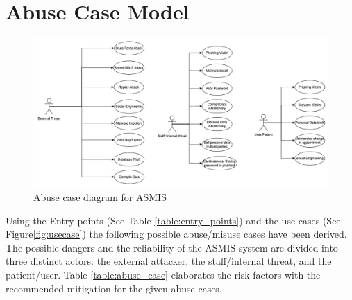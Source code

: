 \section{Abuse Case Model}

\begin{figure}[h!]
\centering
\includegraphics[width=\textwidth]{pics/abusecase.png}
\caption{Abuse case diagram for ASMIS}\label{fig:abuse_case}
\end{figure}

Using the Entry points (See Table \ref{table:entry_points}) and the use cases (See Figure\ref{fig:usecase}) the following possible abuse/misuse cases have been derived.
The possible dangers and the reliability of the ASMIS system are divided into three distinct actors: the external attacker, the staff/internal threat, and the patient/user. Table \ref{table:abuse_case} elaborates the risk factors with the recommended mitigation for the given abuse cases.

